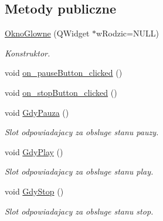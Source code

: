 \subsection*{Metody publiczne}
\begin{DoxyCompactItemize}
\item 
\hyperlink{class_okno_glowne_a8dcfe4e0f18dfaf0c535c4549991b550}{Okno\+Glowne} (Q\+Widget $\ast$w\+Rodzic=N\+U\+L\+L)
\begin{DoxyCompactList}\small\item\em Konstruktor. \end{DoxyCompactList}\item 
void \hyperlink{class_okno_glowne_ae8bd560de9aa835ba8b194b8f7da094c}{on\+\_\+pause\+Button\+\_\+clicked} ()
\item 
void \hyperlink{class_okno_glowne_a63255adc6263a1ee6f67c96b91446b73}{on\+\_\+stop\+Button\+\_\+clicked} ()
\item 
void \hyperlink{class_okno_glowne_a04dc59a4b071d2ccdf500b19b9df7bb9}{Gdy\+Pauza} ()
\begin{DoxyCompactList}\small\item\em Slot odpowiadajacy za obsluge stanu pauzy. \end{DoxyCompactList}\item 
void \hyperlink{class_okno_glowne_a0413b5b46bb0941b8f7ee36f92067e17}{Gdy\+Play} ()
\begin{DoxyCompactList}\small\item\em Slot odpowiadajacy za obsluge stanu play. \end{DoxyCompactList}\item 
void \hyperlink{class_okno_glowne_a10758539b4c164b19503857625d71222}{Gdy\+Stop} ()
\begin{DoxyCompactList}\small\item\em Slot odpowiadajacy za obsluge stanu stop. \end{DoxyCompactList}\end{DoxyCompactItemize}
